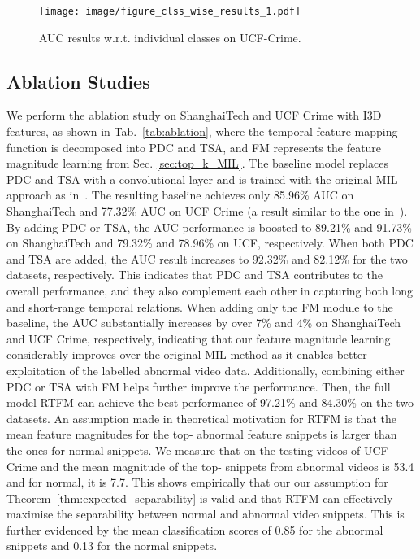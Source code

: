 \documentclass[10pt,twocolumn,letterpaper]{article}
\begin{document}
\begin{figure}[h!]
\begin{center}
\texttt{[image: image/figure\_clss\_wise\_results\_1.pdf]}
\end{center}
  \caption{AUC results w.r.t. individual classes on UCF-Crime.
  }
\label{fig:class_AUC}
\end{figure}

\subsection{Ablation Studies}



We perform the ablation study on ShanghaiTech and UCF Crime with I3D features, as shown in Tab.~\ref{tab:ablation}, where the temporal feature mapping function  is decomposed into PDC and TSA, and FM represents the feature magnitude learning from Sec. \ref{sec:top_k_MIL}. 
The baseline model
replaces PDC and TSA with a  convolutional layer and is trained with the original MIL approach as in~\cite{sultani2018real}. The resulting baseline achieves only 85.96\% AUC on ShanghaiTech and 77.32\% AUC on UCF Crime (a result similar to the one in~\cite{sultani2018real}).
By adding PDC or TSA, the AUC performance is boosted to 89.21\% and 91.73\% on ShanghaiTech and 79.32\% and 78.96\% on UCF, respectively. When both PDC and TSA are added, the AUC result increases to 92.32\% and 82.12\% for the two datasets, respectively. This indicates that PDC and TSA contributes to the overall performance, and they also complement each other in capturing both long and short-range temporal relations.
When adding only the FM module to the baseline, the AUC substantially increases by over 7\% and 4\% on ShanghaiTech and UCF Crime, respectively, indicating that our feature magnitude learning considerably improves over the original MIL method as it enables better exploitation of the labelled abnormal video data. Additionally, combining either PDC or TSA with FM helps further improve the performance. Then, the full model RTFM can achieve the best performance of 97.21\% and 84.30\% on the two datasets.  
An assumption made in theoretical motivation for RTFM is that the mean feature magnitudes for the top- abnormal feature snippets is larger than the ones for normal snippets.
We measure that on the testing videos of UCF-Crime and the mean magnitude of the top- snippets from abnormal videos is 53.4 and for normal, it is 7.7. This shows empirically that our our assumption for Theorem~\ref{thm:expected_separability} is valid and that RTFM can effectively maximise the separability between normal and abnormal video snippets.  This is further evidenced by the mean classification scores of 0.85 for the abnormal snippets and 0.13 for the normal snippets.
\end{document}
